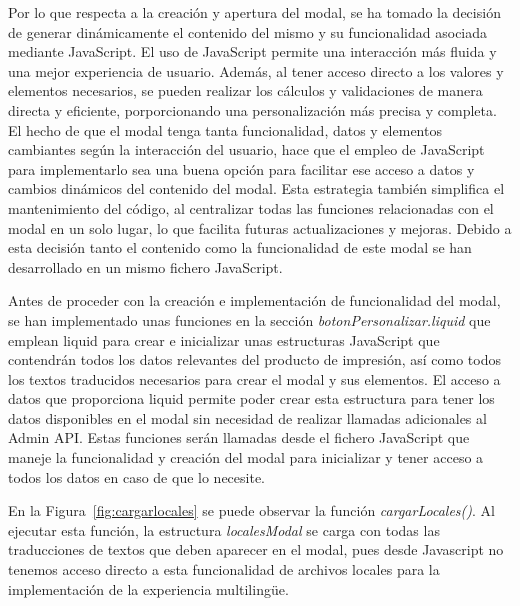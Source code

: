 \documentclass[12pt]{article}
\begin{document}
Por lo que respecta a la creación y apertura del modal, se ha tomado la decisión de generar dinámicamente el contenido del mismo y su funcionalidad
asociada mediante JavaScript. El uso de JavaScript permite una interacción más fluida y una mejor experiencia de usuario. Además, al tener acceso directo 
a los valores y elementos necesarios, se pueden realizar los cálculos y validaciones de manera directa y eficiente, porporcionando una personalización
más precisa y completa. El hecho de que el modal tenga tanta funcionalidad, datos y elementos cambiantes según la interacción del usuario, hace que 
el empleo de JavaScript para implementarlo sea una buena opción para facilitar ese acceso a datos y cambios dinámicos del contenido del modal.
Esta estrategia también simplifica el mantenimiento del código, al centralizar todas las funciones relacionadas con el modal en un solo lugar, lo que facilita
futuras actualizaciones y mejoras. Debido a esta decisión tanto el contenido como la funcionalidad de este modal se han desarrollado en un mismo fichero JavaScript.

Antes de proceder con la creación e implementación de funcionalidad del modal, se han implementado unas funciones en la sección \textit{botonPersonalizar.liquid} que emplean liquid para crear e inicializar unas estructuras JavaScript que 
contendrán todos los datos relevantes del producto de impresión, así como todos los textos traducidos necesarios para crear el modal y sus elementos. El acceso a datos que proporciona liquid permite poder crear 
esta estructura para tener los datos disponibles en el modal sin necesidad de realizar llamadas adicionales al Admin API. Estas funciones serán llamadas desde el fichero 
JavaScript que maneje la funcionalidad y creación del modal para inicializar y tener acceso a todos los datos en caso de que lo necesite.

En la Figura~\ref{fig:cargarlocales} se puede observar la función \textit{cargarLocales()}. Al ejecutar esta función, la estructura \textit{localesModal} se carga con 
todas las traducciones de textos que deben aparecer en el modal, pues desde Javascript no tenemos acceso directo a esta funcionalidad de archivos locales para la implementación 
de la experiencia multilingüe.
\end{document}
